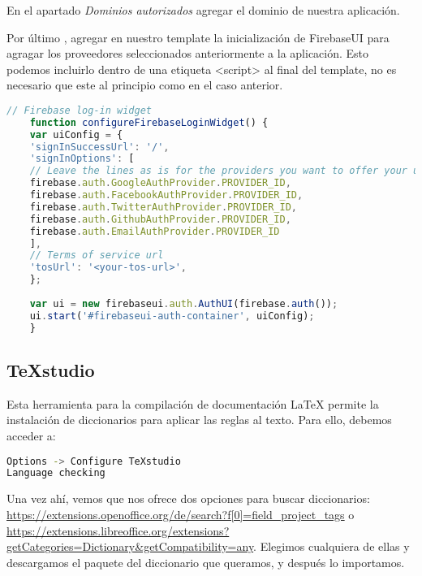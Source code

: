 \begin{steps}
	\item En el apartado \textit{Dominios autorizados} agregar el dominio de nuestra aplicación.
	\item Por último , agregar en nuestro template la inicialización de FirebaseUI para agragar los proveedores seleccionados anteriormente a la aplicación. Esto podemos incluirlo dentro de una etiqueta <script> al final del template, no es necesario que este al principio como en el caso anterior.
	\begin{lstlisting}[language=javascript,caption={Proveedores Firebase.}]
	// Firebase log-in widget
	function configureFirebaseLoginWidget() {
	var uiConfig = {
	'signInSuccessUrl': '/',
	'signInOptions': [
	// Leave the lines as is for the providers you want to offer your users.
	firebase.auth.GoogleAuthProvider.PROVIDER_ID,
	firebase.auth.FacebookAuthProvider.PROVIDER_ID,
	firebase.auth.TwitterAuthProvider.PROVIDER_ID,
	firebase.auth.GithubAuthProvider.PROVIDER_ID,
	firebase.auth.EmailAuthProvider.PROVIDER_ID
	],
	// Terms of service url
	'tosUrl': '<your-tos-url>',
	};
	
	var ui = new firebaseui.auth.AuthUI(firebase.auth());
	ui.start('#firebaseui-auth-container', uiConfig);
	}
	\end{lstlisting}
\end{steps}


  
\subsection{\TeX studio}
Esta herramienta para la compilación de documentación \LaTeX{} permite la instalación de diccionarios para aplicar las reglas al texto. Para ello, debemos acceder a:

\renewcommand{\lstlistingname}{Configure \TeX studio}%
\renewcommand{\lstlistlistingname}{List of \lstlistingname s}
\begin{lstlisting}[language=bash,caption={Añadir diccionario}]
Options -> Configure TeXstudio
Language checking
\end{lstlisting}

Una vez ahí, vemos que nos ofrece dos opciones para buscar diccionarios: \url{https://extensions.openoffice.org/de/search?f[0]=field_project_tags} o \url{https://extensions.libreoffice.org/extensions?getCategories=Dictionary&getCompatibility=any}. Elegimos cualquiera de ellas y descargamos el paquete del diccionario que queramos, y después lo importamos.


